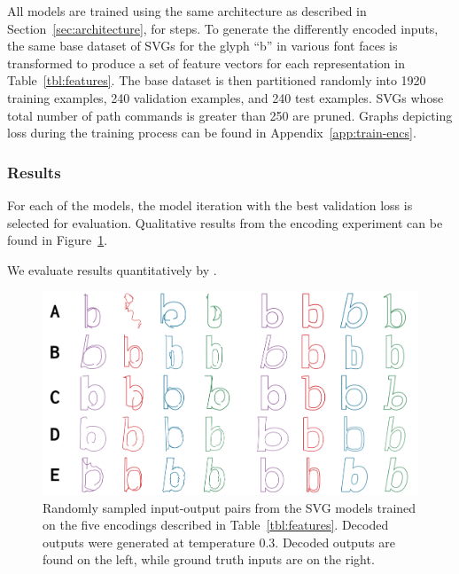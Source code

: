All models are trained using the same architecture as described in Section~\ref{sec:architecture}, for  steps.
To generate the differently encoded inputs, the same base dataset of SVGs for the glyph ``b'' in various font faces is transformed to produce a set of feature vectors for each representation in Table~\ref{tbl:features}.
The base dataset is then partitioned randomly into 1920 training examples, 240 validation examples, and 240 test examples.
SVGs whose total number of path commands is greater than 250 are pruned.
Graphs depicting loss during the training process can be found in Appendix~\ref{app:train-encs}.

\subsubsection{Results}
For each of the models, the model iteration with the best validation loss is selected for evaluation.
Qualitative results from the encoding experiment can be found in Figure~\ref{fig:encodings}.

We evaluate results quantitatively by .

\begin{figure}[t]
	\includegraphics[width=\textwidth]{figures/encodings}
    \caption[Visual results of training the SVG model with different encodings]{Randomly sampled input-output pairs from the SVG models trained on the five encodings described in Table~\ref{tbl:features}. Decoded outputs were generated at temperature 0.3. Decoded outputs are found on the left, while ground truth inputs are on the right.\label{fig:encodings}}
\end{figure}

